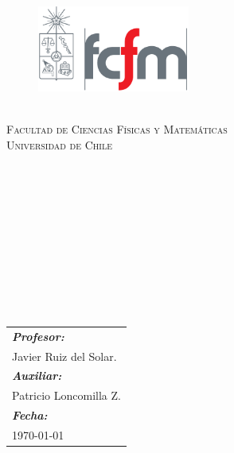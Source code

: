 
\begin{titlepage}
{
\begin{figure}
\vspace{-0.7cm}
\includegraphics[width=5cm]{fcfm.png}
\end{figure}

\textsc{\color{red}\hspace{3.2cm}\departamento}\\
\textsc{\color{gray51}\hspace{3.8cm}Facultad de Ciencias Físicas y Matemáticas}\\
\textsc{\color{gray51}\hspace{3.8cm}Universidad de Chile}\\
\textsc{\color{gray51}\hspace{3.8cm}\ramo}\\
}

\begin{center}
~\\[5cm]
{\color{gray71}\textsc{\hipertitulo}}
\HRule~ \\[0.4cm]
{ \Huge \textup \bfseries  \titulo}\\[0.4cm]
{ \Large \textup{\subtitulo}}\\[0.2cm]
\HRule \\ [0.4cm]
{ \Huge \textup \bfseries  \autor}\\
~\\[3.5cm]
\end{center}

\begin{minipage}{.5\textwidth}
~
\end{minipage}
\begin{minipage}{.45\textwidth}
\begin{flushright}
\begin{tabular}{l}
\textbf{\textit{Profesor:}} \\
{\small Javier Ruiz del Solar.}\\[0.3cm]

\textbf{\textit{Auxiliar:}} \\
{\small Patricio Loncomilla Z.}\\[0.3cm]


\textbf{\textit{Fecha:}}\\
{\small \today}
\end{tabular}
\end{flushright}
\end{minipage}
\begin{minipage}{.05\textwidth}
~
\end{minipage}
\end{titlepage}

\restoregeometry